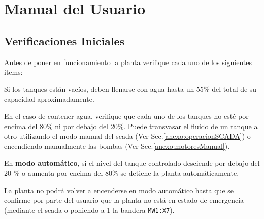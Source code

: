 \chapter{Manual del Usuario}
\label{anexo:manualUsuario}

\section{Verificaciones Iniciales}
\label{anexo:verificaciones}
Antes de poner en funcionamiento la planta verifique cada uno de los siguientes
items:

\begin{tcolorbox}[title=Nivel de agua]
Si los tanques están vacíos, deben llenarse con agua hasta un 55\%
del total de su capacidad aproximadamente.

En el caso de contener agua, verifique que cada uno de los tanques no esté por
encima del 80\% ni por debajo del 20\%.
Puede transvasar el fluido de un tanque a otro utilizando el modo manual del
\gls{scada} (Ver Sec.\ref{anexo:operacionSCADA}) o encendiendo manualmente las 
bombas (Ver Sec.\ref{anexo:motoresManual}).
\end {tcolorbox}
\begin{lattention}
En \textbf{modo automático}, si el nivel del tanque controlado desciende por
debajo del
20 \% o aumenta por encima del 80\% se detiene la planta automáticamente.

La planta no podrá volver a encenderse en modo automático hasta que se confirme
por parte del usuario que la planta no está en estado de emergencia (mediante el
\gls{scada} o poniendo a 1 la bandera \verb|MW1:X7|).
\end{lattention}


